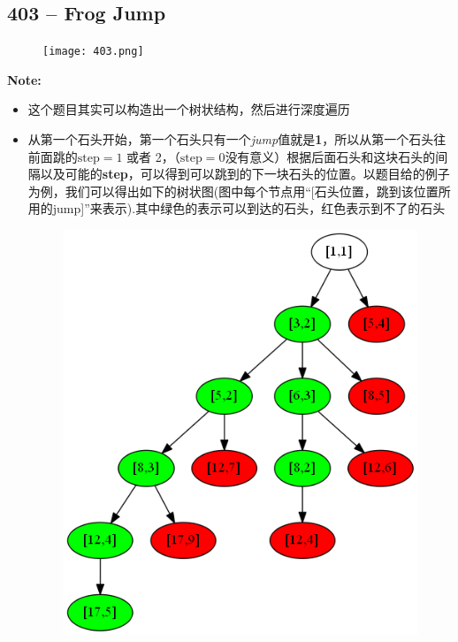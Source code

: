 \documentclass[a4paper,12pt]{article}
\begin{document}
\subsection{403 -- Frog Jump}
\begin{figure}[H]
	\begin{center}
		\texttt{[image: 403.png]}
	\end{center}
\end{figure}
\textbf{\large{Note:}}
\begin{CJK*}{UTF8}{gbsn}
	\begin{itemize}
		\item 这个题目其实可以构造出一个树状结构，然后进行深度遍历
		\item 从第一个石头开始，第一个石头只有一个\textit{jump}值就是\textbf{1}，所以从第一个石头往前面跳的$\text{step} = 1$ 或者 2，（$\text{step}=0$没有意义）根据后面石头和这块石头的间隔以及可能的\textbf{step}，可以得到可以跳到的下一块石头的位置。以题目给的例子为例，我们可以得出如下的树状图(图中每个节点用``[石头位置，跳到该位置所用的jump]''来表示).其中绿色的表示可以到达的石头，红色表示到不了的石头
		\begin{figure}[H]
			\begin{center}
				\includegraphics[width=15cm]{403_Example.png}

\end{center}
\end{figure}
\end{itemize}
\end{CJK*}
\end{document}
